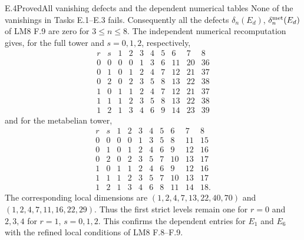 \begin{statement}{E.4}{Proved}{All vanishing defects and the dependent numerical tables}
None of the vanishings in Tasks E.1--E.3 fails.
Consequently all the defects
\(\delta_n(E_d)\), \(\delta_n^{\rm met}(E_d)\)
of LM8 F.9 are zero for \(3\le n\le8\).
The independent numerical recomputation gives,
for the full tower and \(s=0,1,2\), respectively,
\[
\begin{array}{cc|rrrrrrrr}
r&s&1&2&3&4&5&6&7&8\\\hline
0&0&0&0&1&3&6&11&20&36\\
0&1&0&1&2&4&7&12&21&37\\
0&2&0&2&3&5&8&13&22&38\\
1&0&1&1&2&4&7&12&21&37\\
1&1&1&2&3&5&8&13&22&38\\
1&2&1&3&4&6&9&14&23&39
\end{array}
\]
and for the metabelian tower,
\[
\begin{array}{cc|rrrrrrrr}
r&s&1&2&3&4&5&6&7&8\\\hline
0&0&0&0&1&3&5&8&11&15\\
0&1&0&1&2&4&6&9&12&16\\
0&2&0&2&3&5&7&10&13&17\\
1&0&1&1&2&4&6&9&12&16\\
1&1&1&2&3&5&7&10&13&17\\
1&2&1&3&4&6&8&11&14&18.
\end{array}
\]
The corresponding local dimensions are
\((1,2,4,7,13,22,40,70)\) and
\((1,2,4,7,11,16,22,29)\).
Thus the first strict levels remain one for \(r=0\)
and \(2,3,4\) for \(r=1\), \(s=0,1,2\).
This confirms the dependent entries for \(E_1\)
and \(E_6\) with the refined local conditions of
LM8 F.8--F.9.
\end{statement}
